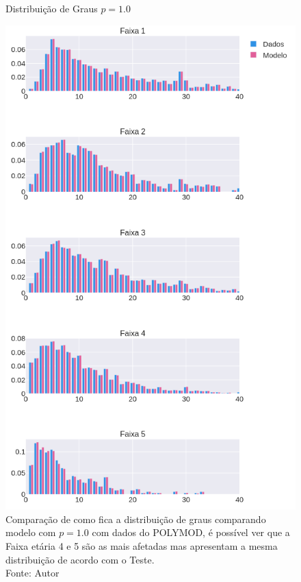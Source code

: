 \begin{figure}[H]
    \centering
    \captionsetup{font=normalsize,skip=0.8pt,singlelinecheck=on,labelsep=endash}
    \caption{Distribuição de Graus $p = 1.0$}
    \includegraphics[scale= 0.4]{figuras/comparacao.png}
    \captionsetup{font=small,justification=justified}
    \caption*{Comparação de como fica a distribuição de graus comparando modelo com $p = 1.0$ com dados do POLYMOD, é possível ver que a Faixa etária 4 e 5 são as mais afetadas mas apresentam a mesma distribuição de acordo com o Teste.\\Fonte: Autor}
    \label{fig:comparacao}
\end{figure}
